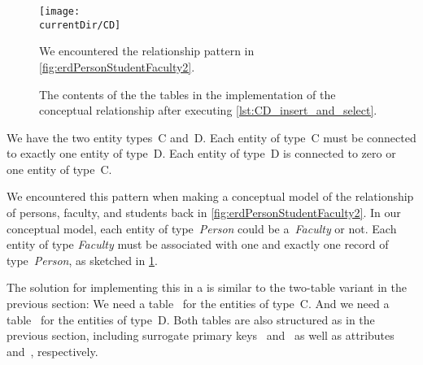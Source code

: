 %
\label{sec:rm:cd}%
%
\begin{figure}%
\centering%
\texttt{[image: \\currentDir/CD]}%
\caption{We encountered the  relationship pattern in \cref{fig:erdPersonStudentFaculty2}.}%
\label{fig:rm:cd}%
\end{figure}%
%
%
%
%
%
%
%
%
\begin{figure}%
\centering%
\floatSep%
%
\floatSep%
%
\floatSep%
\caption{The contents of the the tables in the implementation of the  conceptual relationship after executing \cref{lst:CD_insert_and_select}.}%
\label{fig:rm:cd:tables}%
\end{figure}%
%
%
%
We have the two entity types~C and~D.
Each entity of type~C must be connected to exactly one entity of type~D.
Each entity of type~D is connected to zero or one entity of type~C.

We encountered this pattern when making a conceptual model of the relationship of persons, faculty, and students back in \cref{fig:erdPersonStudentFaculty2}.
In our conceptual model, each entity of type~\emph{Person} could be a~\emph{Faculty} or not.
Each entity of type \emph{Faculty} must be associated with one and exactly one record of type~\emph{Person}, as sketched in \cref{fig:rm:cd}.

The solution for implementing this in a  is similar to the two-table variant in the previous section:
We need a table~ for the entities of type~C.
And we need a table~ for the entities of type~D.
Both tables are also structured as in the previous section, including surrogate primary keys~ and~ as well as attributes~ and~, respectively.

